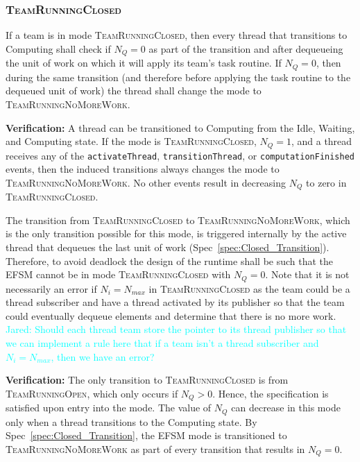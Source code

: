\documentclass{article}
\newcommand{\TeamRunningOpen}   {\textsc{TeamRunningOpen}}
\newcommand{\TeamRunningClosed} {\textsc{TeamRunningClosed}}
\newcommand{\TeamRunningNoMoreWork} {\textsc{TeamRunningNoMoreWork}}
\newcommand{\Jared}[1]          {\textcolor{cyan}{Jared: #1}}
\newcommand{\taskroutine}        {task routine\xspace}
\begin{document}
\subsubsection{\TeamRunningClosed}
\begin{spec}
\label{spec:Closed_Transition}
If a team is in mode \TeamRunningClosed, then every thread that transitions to
Computing shall check if $N_Q = 0$ as part of the transition and after
dequeueing the unit of work on which it will apply its team's \taskroutine.  If $N_Q =
0$, then during the same transition (and therefore before applying the \taskroutine to
the dequeued unit of work) the thread shall change the mode to
\TeamRunningNoMoreWork.
\end{spec}
\textbf{Verification:}\hspace{0.125in}  A thread can be transitioned to
Computing from the Idle, Waiting, and Computing state.  If the mode is
{\TeamRunningClosed}, $N_Q = 1$, and a
thread receives any of the \texttt{activateThread}, \texttt{transitionThread},
or \texttt{computationFinished} events, then the induced transitions always changes
the mode to \TeamRunningNoMoreWork.  No other events result in decreasing $N_Q$
to zero in \TeamRunningClosed.

\begin{spec}
\label{spec:Closed_NoWork}
The transition from {\TeamRunningClosed} to \TeamRunningNoMoreWork, which is the
only transition possible for this mode, is triggered internally by the active
thread that dequeues the last unit of work (Spec~\ref{spec:Closed_Transition}).
Therefore, to avoid deadlock the design of the runtime shall be such that the
EFSM cannot be in mode {\TeamRunningClosed} with $N_Q = 0$.  Note that it is not
necessarily an error if $N_i = N_{max}$ in {\TeamRunningClosed} as the team
could be a thread subscriber and have a thread activated by its publisher so
that the team could eventually dequeue elements and determine that there is no
more work.
\Jared{Should each thread team store the pointer to its thread
publisher so that we can implement a rule here that if a team isn't a thread
subscriber and $N_i = N_{max}$, then we have an error?}
\end{spec}
\textbf{Verification:}\hspace{0.125in}  The only transition to
{\TeamRunningClosed} is from {\TeamRunningOpen}, which only occurs if $N_Q > 0$.
Hence, the specification is satisfied upon entry into the mode.  The value of
$N_Q$ can decrease in this mode only when a thread transitions to the Computing
state.   By Spec~\ref{spec:Closed_Transition}, the EFSM mode is transitioned to
{\TeamRunningNoMoreWork} as part of every transition that results in $N_Q = 0$.
\end{document}
